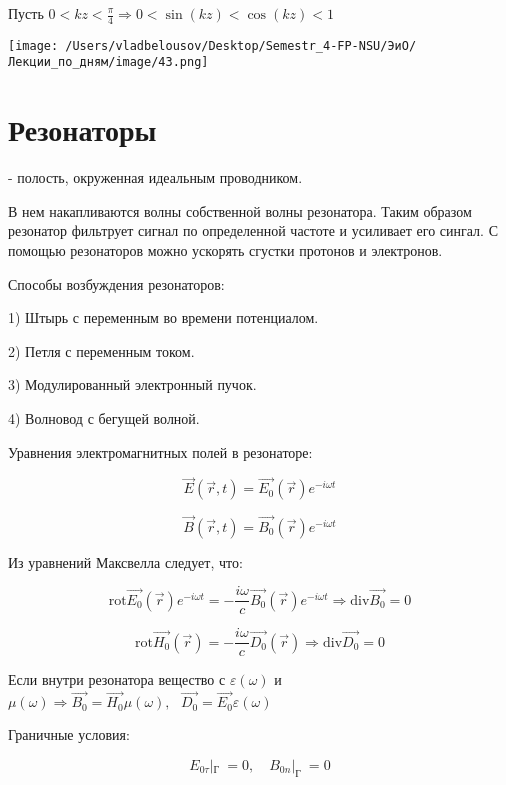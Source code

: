 \documentclass[12pt, a4paper]{report}
\begin{document}
\fi


Пусть \(\displaystyle  0 < kz < \frac{\pi}{4}   \Rightarrow 0 < \sin (kz ) < \cos (kz ) < 1 \) 

\begin{center}
    \texttt{[image: /Users/vladbelousov/Desktop/Semestr\_4-FP-NSU/ЭиО/Лекции\_по\_дням/image/43.png]}
\end{center}

\section{Резонаторы}

- полость, окруженная идеальным проводником. 

В нем накапливаются волны собственной волны резонатора. Таким образом резонатор фильтрует сигнал по определенной частоте и усиливает его сингал. С помощью резонаторов можно ускорять сгустки протонов и электронов.


Способы возбуждения резонаторов: 

1) Штырь с переменным во времени потенциалом. 

2) Петля с переменным током. 

3) Модулированный электронный пучок. 

4) Волновод с бегущей волной. 

Уравнения электромагнитных полей в резонаторе:

\[ \vec{ E } (\vec{r } , t ) = \vec{E_0  }(\vec{r } ) e^{ - i \omega t }   \] 

\[ \vec{B }  (\vec{r } , t )    = \vec{B_0 }(\vec{r } ) e^{ - i \omega t }  \] 

Из уравнений Максвелла следует, что:

\[ \mathrm{rot } \vec{E_0 }(\vec{r } ) e ^{ -i\omega t } = -\frac{i \omega }{c } \vec{B_0 }(\vec{r } ) e^{ -i \omega t}  \Rightarrow \mathrm{div } \vec{B_0 } = 0        \] 

\[ \mathrm{rot } \vec{H_0 }(\vec{r }  ) = - \frac{i \omega }{c } \vec{D_0 }(\vec{r} )  \Rightarrow  \mathrm{div } \vec{D_0  } = 0      \] 

Если внутри резонатора вещество с \( \varepsilon ( \omega ) \) и \( \mu ( \omega ) \Rightarrow \vec{B_0 } = \vec{H_0 } \mu(\omega) ,\text{ }  \vec{D_0 } = \vec{E_0 } \varepsilon ( \omega )   \)   

Граничные условия: 

\[ E_{0 \tau} |_{\text{Г } }  = 0, \quad  B_{0 n} |_{\text{Г } }  = 0  \] 
\end{document}
